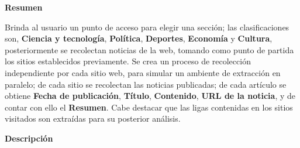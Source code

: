 
\begin{large}
	\textbf{Resumen}\\
\end{large}

Brinda al usuario un punto de acceso para elegir una sección; las clasificaciones son, 
\textbf{Ciencia y tecnología}, \textbf{Política}, \textbf{Deportes}, \textbf{Economía} y  
\textbf{Cultura}, posteriormente se recolectan noticias de la web, tomando como punto de 
partida los sitios establecidos previamente. Se crea un proceso de 
recolección independiente por cada sitio web, para simular un ambiente de extracción 
en paralelo; de cada sitio se recolectan las noticias publicadas; de cada artículo se obtiene 
\textbf{Fecha de publicación}, \textbf{Título}, \textbf{Contenido}, \textbf{URL de la noticia}, y de contar con ello el \textbf{Resumen}. Cabe destacar que 
las ligas contenidas en los sitios visitados son extraídas para su posterior análisis.\\

\begin{large}
	\textbf{Descripción}\\
\end{large} 


